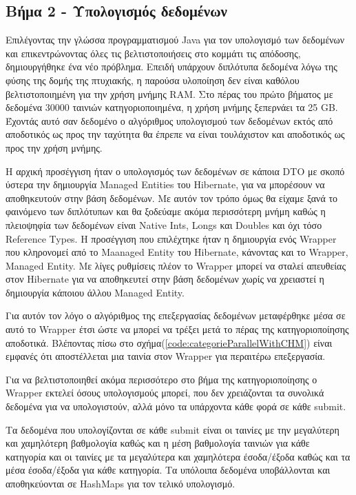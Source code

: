 \subsection{Βήμα 2 - Υπολογισμός  δεδομένων}

Επιλέγοντας την γλώσσα προγραμματισμού Java για τον υπολογισμό των δεδομένων και επικεντρώνοντας όλες τις βελτιστοποιήσεις στο κομμάτι τις απόδοσης, δημιουργήθηκε ένα νέο πρόβλημα. Επειδή υπάρχουν διπλότυπα δεδομένα λόγω της φύσης της δομής της πτυχιακής, η παρούσα υλοποίηση δεν είναι καθόλου βελτιστοποιημένη για την χρήση μνήμης RAM. Στο πέρας του πρώτο βήματος με δεδομένα 30000 ταινιών κατηγοριοποιημένα, η χρήση μνήμης ξεπερνάει τα 25 GB. Έχοντάς αυτό σαν δεδομένο ο αλγόριθμος υπολογισμού των δεδομένων εκτός από αποδοτικός ως προς την ταχύτητα θα έπρεπε να είναι τουλάχιστον και αποδοτικός ως προς την χρήση μνήμης.

Η αρχική προσέγγιση ήταν ο υπολογισμός των δεδομένων σε κάποια DTO με σκοπό ύστερα την δημιουργία Managed Entities του Hibernate, για να μπορέσουν να αποθηκευτούν στην βάση δεδομένων. Με αυτόν τον τρόπο όμως θα είχαμε ξανά το φαινόμενο των διπλότυπων και θα ξοδεύαμε ακόμα περισσότερη μνήμη καθώς η πλειοψηφία των δεδομένων είναι Native Ints, Longs και Doubles και όχι τόσο Reference Types. Η προσέγγιση που επιλέχτηκε ήταν η δημιουργία ενός Wrapper που κληρονομεί από το Maanaged Entity του Hibernate, κάνοντας και το Wrapper, Managed Entity. Με λίγες ρυθμίσεις πλέον το Wrapper μπορεί να σταλεί απευθείας στον Hibernate για να αποθηκευτεί στην βάση δεδομένων χωρίς να χρειαστεί η δημιουργία κάποιου άλλου Managed Entity.

Για αυτόν τον λόγο ο αλγόριθμος της επεξεργασίας δεδομένων μεταφέρθηκε μέσα σε αυτό το Wrapper έτσι ώστε να μπορεί να τρέξει μετά το πέρας της κατηγοριοποίησης αποδοτικά. Βλέποντας πίσω στο σχήμα(\ref{code:categorieParallelWithCHM}) είναι εμφανές ότι αποστέλλεται μια ταινία στον Wrapper για περαιτέρω επεξεργασία. 

Για να βελτιστοποιηθεί ακόμα περισσότερο στο βήμα της κατηγοριοποίησης ο Wrapper εκτελεί όσους υπολογισμούς μπορεί, που δεν χρειάζονται τα συνολικά δεδομένα για να υπολογιστούν, αλλά μόνο τα υπάρχοντα κάθε φορά σε κάθε submit.

Τα δεδομένα που υπολογίζονται σε κάθε submit είναι οι ταινίες με την μεγαλύτερη και χαμηλότερη βαθμολογία καθώς και η μέση βαθμολογία ταινιών για κάθε κατηγορία και οι ταινίες με τα μεγαλύτερα και χαμηλότερα έσοδα/έξοδα καθώς και τα μέσα έσοδα/έξοδα για κάθε κατηγορία. Τα υπόλοιπα δεδομένα υποβάλλονται και αποθηκεύονται σε HashMaps για τον τελικό υπολογισμό.

